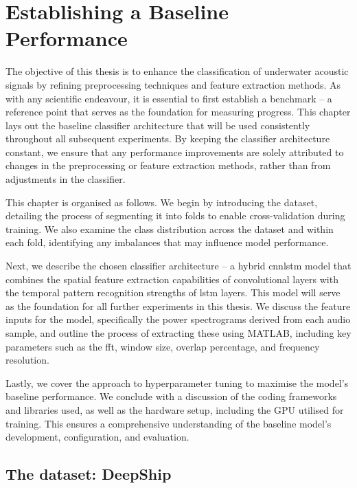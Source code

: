 \chapter{Establishing a Baseline Performance}


The objective of this thesis is to enhance the classification of underwater acoustic signals by refining preprocessing techniques and feature extraction methods. As with any scientific endeavour, it is essential to first establish a benchmark -- a reference point that serves as the foundation for measuring progress. This chapter lays out the baseline classifier architecture that will be used consistently throughout all subsequent experiments. By keeping the classifier architecture constant, we ensure that any performance improvements are solely attributed to changes in the preprocessing or feature extraction methods, rather than from adjustments in the classifier.

This chapter is organised as follows. We begin by introducing the dataset, detailing the process of segmenting it into folds to enable cross-validation during training. We also examine the class distribution across the dataset and within each fold, identifying any imbalances that may influence model performance.

Next, we describe the chosen classifier architecture -- a hybrid \acrshort{cnnlstm} model that combines the spatial feature extraction capabilities of convolutional layers with the temporal pattern recognition strengths of \acrshort{lstm} layers. This model will serve as the foundation for all further experiments in this thesis. We discuss the feature inputs for the model, specifically the power spectrograms derived from each audio sample, and outline the process of extracting these using MATLAB, including key parameters such as the \acrshort{fft}, window size, overlap percentage, and frequency resolution. 

Lastly, we cover the approach to hyperparameter tuning to maximise the model's baseline performance. We conclude with a discussion of the coding frameworks and libraries used, as well as the hardware setup, including the GPU utilised for training. This ensures a comprehensive understanding of the baseline model's development, configuration, and evaluation.

\section{The dataset: DeepShip}

